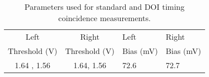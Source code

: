 \begin{table}
\caption{\label{tab:optimumparam} Parameters used for standard and DOI timing coincidence measurements.} 
\begin{tabular}{ccll}
\hline
Left &  Right & Left & Right\\
Threshold (V) & Threshold (V)& Bias (mV) & Bias (mV)\\
\hline
1.64 , 1.56 &  1.64, 1.56 &  72.6 &  72.7\\
\hline
\end{tabular}
\end{table}